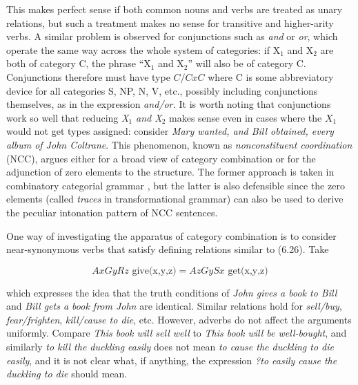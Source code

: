 \smallskip\noindent This makes perfect sense if both common nouns and verbs
are treated as unary relations, but such a treatment makes no sense for
transitive and higher-arity verbs. A similar problem is observed for
conjunctions such as {\it and} or {\it or}, which operate the same way across
the whole system of categories: if X$_1$ and X$_2$ are both of category C, the
phrase ``X$_1$ and X$_2$'' will also be of category C. Conjunctions therefore
must have type $C/CxC$ where C is some abbreviatory device for all categories
S, NP, N, V, etc., possibly including conjunctions themselves, as in the
expression {\it and/or.} It is worth noting that conjunctions work so well
that reducing {\it X$_1$ and X$_2$} makes sense even in cases where the $X_1$
would not get types assigned: consider {\it Mary wanted, and Bill obtained,
  every album of John Coltrane}. This phenomenon, known as {\it nonconstituent
  coordination} (NCC), argues either
for a broad view of category combination or for the adjunction of zero
elements to the structure. The former approach is taken in combinatory
categorial grammar \cite{Steedman:2001}, but the latter is also defensible
since the zero elements (called {\it traces} in transformational grammar)
 can also be used to derive the peculiar intonation pattern of
NCC sentences.

One way of investigating the apparatus of category combination is to consider
near-synonymous verbs that satisfy defining relations similar to (6.26). Take

\begin{equation}
A x G y R z \text{ give(x,y,z)} = A z G y S x \text{ get(x,y,z)}
\end{equation}

\smallskip\noindent which expresses the idea that the truth conditions of {\it
  John gives a book to Bill} and {\it Bill gets a book from John} are
identical. Similar relations hold for {\it sell/buy}, {\it fear/frighten},
{\it kill/cause to die}, etc.  However, adverbs do not affect the arguments
uniformly. Compare {\it This book will sell well} to {\it *This book will be
  well-bought}, and similarly {\it to kill the duckling easily} does not mean
{\it to cause the duckling to die easily}, and it is not clear what, if
anything, the expression {\it ?to easily cause the duckling to die} should
mean.

